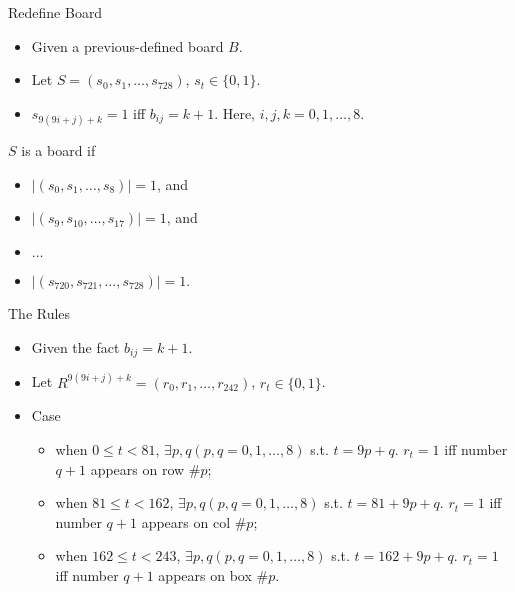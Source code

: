 \documentclass[11pt]{beamer}
\theoremstyle{definition}
\begin{document}
\begin{frame}{Redefine Board}
    \begin{itemize}
        \item Given a previous-defined board $B$.
        \item Let $S=(s_0, s_1, \ldots, s_{728})$, $s_t \in \{0, 1\}$.
        \item $s_{9(9i + j) + k} = 1$ iff $b_{ij} = k + 1$. Here, $i,j,k=0, 1, \ldots, 8$.
    \end{itemize}
    \begin{definition}
        $S$ is a board if
        \begin{itemize}
            \item $\lvert (s_0, s_1, \ldots, s_8) \rvert = 1$, and
            \item $\lvert (s_9, s_{10}, \ldots, s_{17}) \rvert = 1$, and
            \item $\ldots$
            \item $\lvert (s_{720}, s_{721}, \ldots, s_{728}) \rvert = 1$.
        \end{itemize}
    \end{definition}
\end{frame}

\begin{frame}{The Rules}
    \begin{itemize}
        \item Given the fact $b_{ij}=k+1$.
        \item Let $R^{9(9i + j) + k}=(r_0, r_1, \ldots, r_{242})$, $r_t \in \{0, 1\}$.
        \item Case
        \begin{itemize}
            \item when $0 \le t < 81$, $\exists p, q (p,q=0,1,\ldots, 8)$ s.t. $t=9p+q$. $r_t=1$ iff number $q+1$ appears on row \#$p$;
            \item when $81 \le t < 162$, $\exists p, q (p,q=0,1,\ldots, 8)$ s.t. $t=81+9p+q$. $r_t=1$ iff number $q+1$ appears on col \#$p$;
            \item when $162 \le t < 243$, $\exists p, q (p,q=0,1,\ldots, 8)$ s.t. $t=162+9p+q$. $r_t=1$ iff number $q+1$ appears on box \#$p$.
        \end{itemize}
    \end{itemize}
\end{frame}
\end{document}
